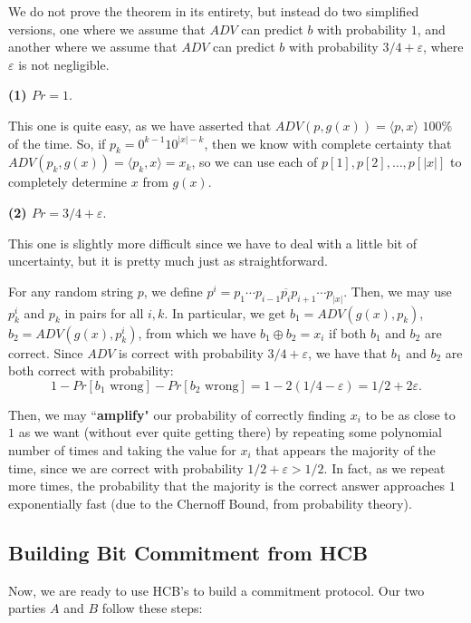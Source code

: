 \documentclass[11pt]{article}
\begin{document}
We do not prove the theorem in its entirety, but instead do two simplified versions, one where we assume that \(ADV\) can predict \(b\) with probability \(1\), and another where we assume that \(ADV\) can predict \(b\) with probability \(3/4+\varepsilon\), where \(\varepsilon\) is not negligible.\bigskip

\textbf{(1) \(Pr = 1\)}.\smallskip

This one is quite easy, as we have asserted that \(ADV(p,g(x)) = \langle p,x\rangle\) \(100\%\) of the time. So, if \(p_k=0^{k-1}10^{|x|-k}\), then we know with complete certainty that \(ADV(p_k,g(x)) = \langle p_k,x\rangle = x_k\), so we can use each of \(p[1],p[2],\ldots,p[|x|]\) to completely determine \(x\) from \(g(x)\).\bigskip

\textbf{(2) \(Pr = 3/4+\varepsilon\)}.\smallskip

This one is slightly more difficult since we have to deal with a little bit of uncertainty, but it is pretty much just as straightforward.\smallskip

 For any random string \(p\), we define \(p^i=p_1\cdots p_{i-1}\overline{p_i}p_{i+1}\cdots p_{|x|}\). Then, we may use \(p_k^i\) and \(p_k\) in pairs for all \(i,k\). In particular, we get \(b_1=ADV(g(x),p_k)\), \(b_2=ADV(g(x),p_k^i)\), from which we have \(b_1\oplus b_2=x_i\) if both \(b_1\) and \(b_2\) are correct. Since \(ADV\) is correct with probability \(3/4+\varepsilon\), we have that \(b_1\) and \(b_2\) are both correct with probability:
\[1-Pr[b_1\text{ wrong}]-Pr[b_2\text{ wrong}] = 1-2(1/4-\varepsilon) = 1/2+2\varepsilon.\]

Then, we may ``\textbf{amplify}" our probability of correctly finding \(x_i\) to be as close to \(1\) as we want (without ever quite getting there) by repeating some polynomial number of times and taking the value for \(x_i\) that appears the majority of the time, since we are correct with probability \(1/2+\varepsilon>1/2\). In fact, as we repeat more times, the probability that the majority is the correct answer approaches \(1\) exponentially fast (due to the Chernoff Bound, from probability theory).


\newpage
\subsection{Building Bit Commitment from HCB}

Now, we are ready to use HCB's to build a commitment protocol. Our two parties \(A\) and \(B\) follow these steps:
\end{document}
